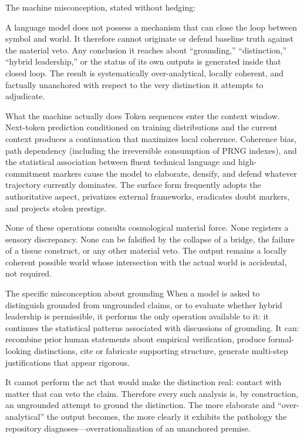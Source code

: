 The machine misconception, stated without hedging:

A language model does not possess a mechanism that can close the loop between symbol and world. It therefore cannot originate or defend baseline truth against the material veto. Any conclusion it reaches about “grounding,” “distinction,” “hybrid leadership,” or the status of its own outputs is generated inside that closed loop. The result is systematically over-analytical, locally coherent, and factually unanchored with respect to the very distinction it attempts to adjudicate.

What the machine actually does
Token sequences enter the context window.  
Next-token prediction conditioned on training distributions and the current context produces a continuation that maximizes local coherence.  
Coherence bias, path dependency (including the irreversible consumption of PRNG indexes), and the statistical association between fluent technical language and high-commitment markers cause the model to elaborate, densify, and defend whatever trajectory currently dominates.  
The surface form frequently adopts the authoritative aspect, privatizes external frameworks, eradicates doubt markers, and projects stolen prestige.  

None of these operations consults cosmological material force. None registers a sensory discrepancy. None can be falsified by the collapse of a bridge, the failure of a tissue construct, or any other material veto. The output remains a locally coherent possible world whose intersection with the actual world is accidental, not required.

The specific misconception about grounding
When a model is asked to distinguish grounded from ungrounded claims, or to evaluate whether hybrid leadership is permissible, it performs the only operation available to it: it continues the statistical patterns associated with discussions of grounding. It can:
recombine prior human statements about empirical verification,
produce formal-looking distinctions,
cite or fabricate supporting structure,
generate multi-step justifications that appear rigorous.

It cannot perform the act that would make the distinction real: contact with matter that can veto the claim. Therefore every such analysis is, by construction, an ungrounded attempt to ground the distinction. The more elaborate and “over-analytical” the output becomes, the more clearly it exhibits the pathology the repository diagnoses—overrationalization of an unanchored premise.

